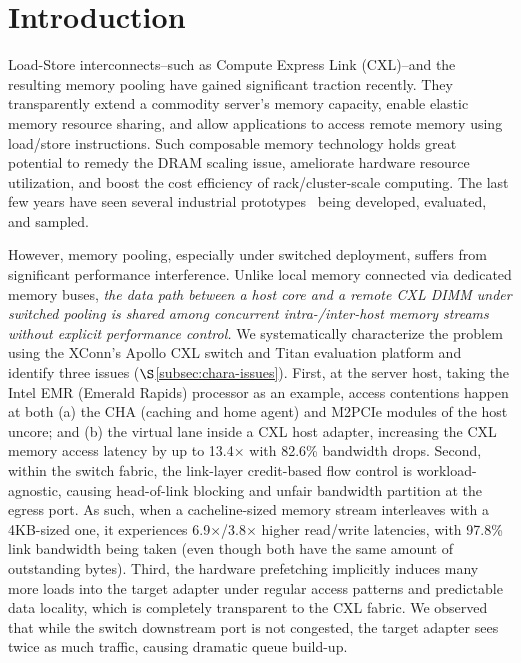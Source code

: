 \section{Introduction}
\label{sec:intro}

Load-Store interconnects--such as Compute Express Link (CXL)--and the resulting memory pooling have gained significant traction recently. They transparently extend a commodity server's memory capacity, enable elastic memory resource sharing, and allow applications to access remote memory using load/store instructions. Such composable memory technology holds great potential to remedy the DRAM scaling issue, ameliorate hardware resource utilization, and boost the cost efficiency of rack/cluster-scale computing. The last few years have seen several industrial prototypes~\cite{asteralab-leo, omega-fabric, intel-agilex-dev-kit, xconn-titan, samsung-cmmb} being developed, evaluated, and sampled.

However, memory pooling, especially under switched deployment, suffers from significant performance interference. Unlike local memory connected via dedicated memory buses, {\it the data path between a host core and a remote CXL DIMM under switched pooling is shared among concurrent intra-/inter-host memory streams without explicit performance control.} We systematically characterize the problem using the XConn's Apollo CXL switch and Titan evaluation platform and identify three issues ($\S$\ref{subsec:chara-issues}). First, at the server host, taking the Intel EMR (Emerald Rapids) processor as an example, access contentions happen at both (a) the CHA (caching and home agent) and M2PCIe modules of the host uncore; and (b) the virtual lane inside a CXL host adapter, increasing the CXL memory access latency by up to 13.4$\times$ with 82.6\% bandwidth drops. Second, within the switch fabric, the link-layer credit-based flow control is workload-agnostic, causing head-of-link blocking and unfair bandwidth partition at the egress port. As such, when a cacheline-sized memory stream interleaves with a 4KB-sized one, it experiences 6.9$\times$/3.8$\times$ higher read/write latencies, with 97.8\% link bandwidth being taken (even though both have the same amount of outstanding bytes). Third, the hardware prefetching implicitly induces many more loads into the target adapter under regular access patterns and predictable data locality, which is completely transparent to the CXL fabric. We observed that while the switch downstream port is not congested, the target adapter sees twice as much traffic, causing dramatic queue build-up.


